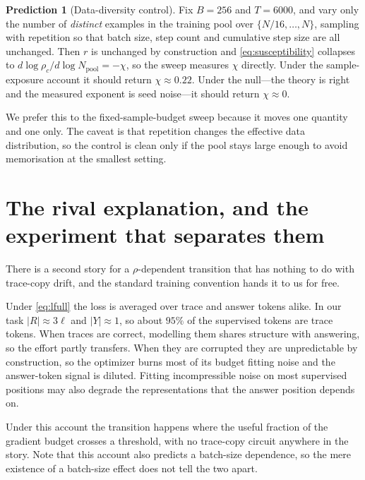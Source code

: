 \documentclass{article}
\theoremstyle{plain}
\theoremstyle{definition}
\newtheorem{prediction}{Prediction}
\theoremstyle{remark}
\newcommand{\1}{\mathbf{1}}
\begin{document}
\begin{prediction}[Data-diversity control]
\label{pred:diversity}
Fix $B = 256$ and $T = 6000$, and vary only the number of \emph{distinct}
examples in the training pool over $\{N/16,\dots,N\}$, sampling with repetition
so that batch size, step count and cumulative step size are all unchanged. Then
$r$ is unchanged by construction and \eqref{eq:susceptibility} collapses to
$d\log\rho_c/d\log N_{\mathrm{pool}} = -\chi$, so the sweep measures $\chi$
directly. Under the sample-exposure account it should return $\chi\approx0.22$.
Under the null---the theory is right and the measured exponent is seed noise---it
should return $\chi\approx0$.
\end{prediction}

We prefer this to the fixed-sample-budget sweep because it moves one quantity and
one only. The caveat is that repetition changes the effective data distribution,
so the control is clean only if the pool stays large enough to avoid memorisation
at the smallest setting.

\section{The rival explanation, and the experiment that separates them}
\label{sec:competing}

There is a second story for a $\rho$-dependent transition that has nothing to do
with trace-copy drift, and the standard training convention hands it to us for
free.

Under \eqref{eq:lfull} the loss is averaged over trace and answer tokens alike.
In our task $|R|\approx3\ell$ and $|Y|\approx1$, so about $95\%$ of the
supervised tokens are trace tokens. When traces are correct, modelling them
shares structure with answering, so the effort partly transfers. When they are
corrupted they are unpredictable by construction, so the optimizer burns most of
its budget fitting noise and the answer-token signal is diluted. Fitting
incompressible noise on most supervised positions may also degrade the
representations that the answer position depends on.

Under this account the transition happens where the useful fraction of the
gradient budget crosses a threshold, with no trace-copy circuit anywhere in the
story. Note that this account also predicts a batch-size dependence, so the mere
existence of a batch-size effect does not tell the two apart.
\end{document}
